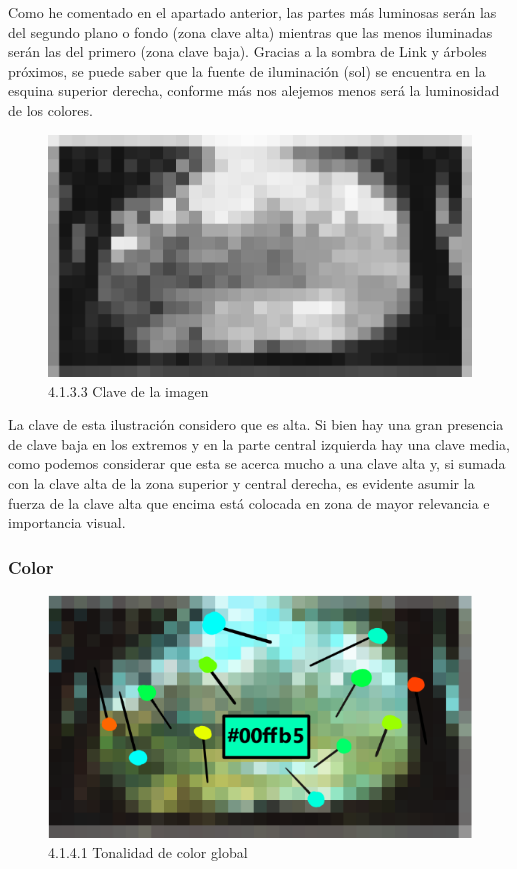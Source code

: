 \documentclass[12pt]{article}
\begin{document}
    Como he comentado en el apartado anterior, las partes más luminosas serán las del segundo plano o fondo (zona clave alta) mientras que las menos iluminadas serán las del primero (zona clave baja). Gracias a la sombra de Link y árboles próximos, se puede saber que la fuente de iluminación (sol) se encuentra en la esquina superior derecha, conforme más nos alejemos menos será la luminosidad de los colores.

    \begin{figure}[H]
      \centering
      \includegraphics[scale=0.4]{images/Nerea/Nerea Zelda concept 133.PNG}
      \caption{\small 4.1.3.3 Clave de la imagen}
    \end{figure}

    La clave de esta ilustración considero que es alta. Si bien hay una gran presencia de clave baja en los extremos y en la parte central izquierda hay una clave media, como podemos considerar que esta se acerca mucho a una clave alta y, si sumada con la clave alta de la zona superior y central derecha, es evidente asumir la fuerza de la clave alta que encima está colocada en zona de mayor relevancia e importancia visual.


        \subsubsection{Color}


    \begin{figure}[H]
      \centering
      \includegraphics[scale=0.4]{images/Nerea/Nerea Zelda concept 141.PNG}
      \caption{\small 4.1.4.1 Tonalidad de color global}
    \end{figure}
\end{document}
